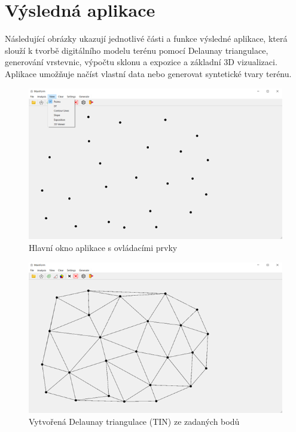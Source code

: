 \section{Výsledná aplikace}

Následující obrázky ukazují jednotlivé části a funkce výsledné aplikace, která slouží k tvorbě digitálního modelu terénu pomocí Delaunay triangulace, generování vrstevnic, výpočtu sklonu a expozice a základní 3D vizualizaci. Aplikace umožňuje načíst vlastní data nebo generovat syntetické tvary terénu.

\begin{figure}[H]
    \centering
    \includegraphics[width=\textwidth]{images/Ukazka_aplikace.png}
    \caption{Hlavní okno aplikace s ovládacími prvky}
\end{figure}

\begin{figure}[H]
    \centering
    \includegraphics[width=\textwidth]{images/Ukazka_DT.png}
    \caption{Vytvořená Delaunay triangulace (TIN) ze zadaných bodů}
\end{figure}


